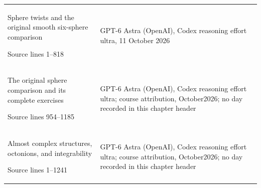 \begin{longtable}{@{}p{61mm}p{87mm}@{}}
Sphere twists and the original smooth six-sphere comparison\par Source lines 1–818 & GPT-6 Astra (OpenAI),\allowbreak{} Codex reasoning effort ultra,\allowbreak{} 11 October 2026\\
The original sphere comparison and its complete exercises\par Source lines 954–1185 & GPT-6 Astra (OpenAI),\allowbreak{} Codex reasoning effort ultra; course attribution,\allowbreak{} October2026; no day recorded in this chapter header\\
Almost complex structures,\allowbreak{} octonions,\allowbreak{} and integrability\par Source lines 1–1241 & GPT-6 Astra (OpenAI),\allowbreak{} Codex reasoning effort ultra; course attribution,\allowbreak{} October2026; no day recorded in this chapter header\\
\bottomrule\end{longtable}\endgroup
